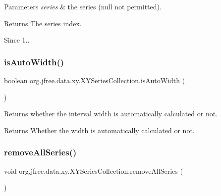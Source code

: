 \begin{DoxyParams}{Parameters}
{\em series} & the series ({\ttfamily null} not permitted).\\
\hline
\end{DoxyParams}
\begin{DoxyReturn}{Returns}
The series index.
\end{DoxyReturn}
\begin{DoxySince}{Since}
1.. 
\end{DoxySince}
\mbox{\label{classorg_1_1jfree_1_1data_1_1xy_1_1_x_y_series_collection_a1dfc251753ab5502bccaa16c07a52fbe}} 
\subsubsection{\texorpdfstring{is\+Auto\+Width()}{isAutoWidth()}}
{\footnotesize\ttfamily boolean org.\+jfree.\+data.\+xy.\+X\+Y\+Series\+Collection.\+is\+Auto\+Width (\begin{DoxyParamCaption}{ }\end{DoxyParamCaption})}

Returns whether the interval width is automatically calculated or not.

\begin{DoxyReturn}{Returns}
Whether the width is automatically calculated or not. 
\end{DoxyReturn}
\mbox{\label{classorg_1_1jfree_1_1data_1_1xy_1_1_x_y_series_collection_a7ed12fb0bda86b5d75d21eacc832d9cf}} 
\subsubsection{\texorpdfstring{remove\+All\+Series()}{removeAllSeries()}}
{\footnotesize\ttfamily void org.\+jfree.\+data.\+xy.\+X\+Y\+Series\+Collection.\+remove\+All\+Series (\begin{DoxyParamCaption}{ }\end{DoxyParamCaption})}

